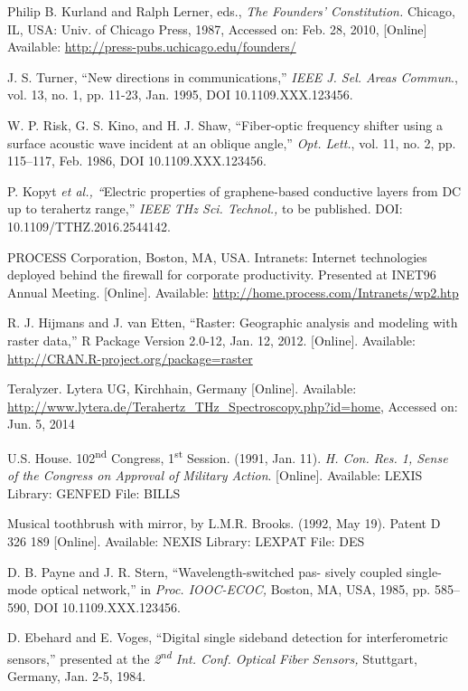 \documentclass{ieeeaccess}
\begin{document}
\begin{thebibliography}{00}
     Philip B. Kurland and Ralph Lerner, eds., \emph{The
        Founders' Constitution.} Chicago, IL, USA: Univ. of Chicago Press,
    1987, Accessed on: Feb. 28, 2010, [Online] Available:
    \underline{http://press-pubs.uchicago.edu/founders/}

     J. S. Turner, ``New directions in communications,'' \emph{IEEE J. Sel. Areas Commun}., vol. 13, no. 1, pp. 11-23, Jan. 1995, DOI 10.1109.XXX.123456.

     W. P. Risk, G. S. Kino, and H. J. Shaw, ``Fiber-optic frequency shifter using a surface acoustic wave incident at an oblique angle,'' \emph{Opt. Lett.}, vol. 11, no. 2, pp. 115--117, Feb. 1986, DOI 10.1109.XXX.123456.

     P. Kopyt \emph{et al., ``}Electric properties of graphene-based conductive layers from DC up to terahertz range,'' \emph{IEEE THz Sci. Technol.,} to be published. DOI: 10.1109/TTHZ.2016.2544142.

     PROCESS Corporation, Boston, MA, USA. Intranets:
    Internet technologies deployed behind the firewall for corporate
    productivity. Presented at INET96 Annual Meeting. [Online].
    Available: \underline{http://home.process.com/Intranets/wp2.htp}

     R. J. Hijmans and J. van Etten, ``Raster: Geographic analysis and modeling with raster data,'' R Package Version 2.0-12, Jan. 12, 2012. [Online]. Available: \underline {http://CRAN.R-project.org/package=raster}

     Teralyzer. Lytera UG, Kirchhain, Germany [Online].
    Available:
    \underline{http://www.lytera.de/Terahertz\_THz\_Spectroscopy.php?id=home}, Accessed on: Jun. 5, 2014

     U.S. House. 102\textsuperscript{nd} Congress, 1\textsuperscript{st} Session. (1991, Jan. 11). \emph{H. Con. Res. 1, Sense of the Congress on Approval of}  \emph{Military Action}. [Online]. Available: LEXIS Library: GENFED File: BILLS

     Musical toothbrush with mirror, by L.M.R. Brooks. (1992, May 19). Patent D 326 189 [Online]. Available: NEXIS Library: LEXPAT File: DES

     D. B. Payne and J. R. Stern, ``Wavelength-switched pas- sively coupled single-mode optical network,'' in \emph{Proc. IOOC-ECOC,} Boston, MA, USA, 1985, pp. 585--590, DOI 10.1109.XXX.123456.

     D. Ebehard and E. Voges, ``Digital single sideband detection for interferometric sensors,'' presented at the \emph{2\textsuperscript{nd} Int. Conf. Optical Fiber Sensors,} Stuttgart, Germany, Jan. 2-5, 1984.


\end{thebibliography}
\end{document}

